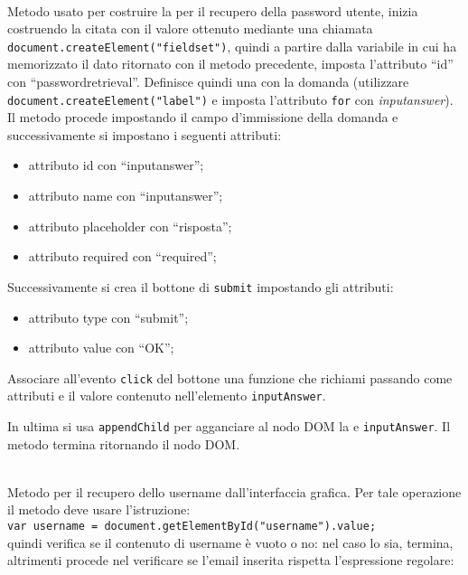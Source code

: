 \begin{description}
	\item{}\\
	Metodo usato per costruire la  per il recupero della password utente, inizia costruendo la citata  con il valore ottenuto mediante una chiamata \verb|document.createElement("fieldset")|, quindi a partire dalla variabile in cui ha memorizzato il dato ritornato con il metodo precedente, imposta l'attributo ``id'' con ``passwordretrieval''. Definisce quindi una  con la domanda (utilizzare \verb|document.createElement("label")| e imposta l'attributo \texttt{for} con \textit{inputanswer}). Il metodo procede impostando il campo d'immissione della domanda e successivamente si impostano i seguenti attributi:
	\begin{itemize}
		\item attributo id con ``inputanswer'';
		\item attributo name con ``inputanswer'';
		\item attributo placeholder con ``risposta'';
		\item attributo required con ``required'';
	\end{itemize}
	
	Successivamente si crea il bottone di \texttt{submit} impostando gli attributi:
	\begin{itemize}
		\item attributo type con ``submit'';
		\item attributo value con ``OK'';
	\end{itemize}
	
	Associare all'evento \texttt{click} del bottone una funzione che richiami  passando come attributi  e il valore contenuto nell'elemento \texttt{inputAnswer}.
	
	In ultima si usa \texttt{appendChild} per agganciare al nodo DOM la  e \texttt{inputAnswer}. Il metodo termina ritornando il nodo DOM.
	
	\item{}\\
	Metodo  per il recupero dello username dall'interfaccia grafica. Per tale operazione il metodo deve usare l'istruzione:\\
	
	\verb|var username = document.getElementById("username").value;|
	\\
	
	quindi verifica se il contenuto di username è vuoto o no: nel caso lo sia, termina, altrimenti procede nel verificare se l'email inserita rispetta l'espressione regolare:\\
	

\end{description}
